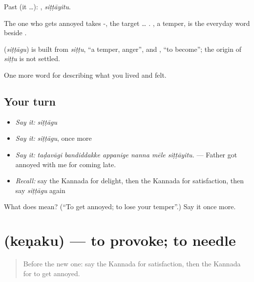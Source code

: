 Past (it …): , \emph{siṭṭāyitu}.

The one who gets annoyed takes -, the target … . , a temper, is the everyday word beside .

\begin{cousinweb}
\textbf{} (\emph{siṭṭāgu}) is built from \emph{siṭṭu}, \textquotedblleft{}a temper, anger\textquotedblright{}, and , \textquotedblleft{}to become\textquotedblright{}; the origin of \emph{siṭṭu} is not settled.
\end{cousinweb}

\begin{grammarlens}[title={What you've built}]
One more word for describing what you lived and felt.
\end{grammarlens}

\subsection*{Your turn}
\begin{itemize}
\raggedright
  \item \emph{Say it:} \emph{siṭṭāgu}
  \item \emph{Say it:} \emph{siṭṭāgu}, once more
  \item \emph{Say it:} \emph{taḍavāgi bandiddakke appanige nanna mēle siṭṭāyitu.} — Father got annoyed with me for coming late.
  \item \emph{Recall:} say the Kannada for delight, then the Kannada for satisfaction, then say \emph{siṭṭāgu} again
\end{itemize}

\begin{tcolorbox}[breakable,colback=teal!4,colframe=teal!35!black,title={Before you move on}]
What does  mean? (\textquotedblleft{}To get annoyed; to lose your temper\textquotedblright{}.) Say it once more.
\end{tcolorbox}
\section[\texorpdfstring{\kn{ಕೆಣಕು} (keṇaku)}{ಕೆಣಕು (keṇaku)}]{ (keṇaku) — to provoke; to needle}

\label{lesson:KA-C493-kenaku}



\begin{quote}
Before the new one: say the Kannada for satisfaction, then the Kannada for to get annoyed.
\end{quote}

